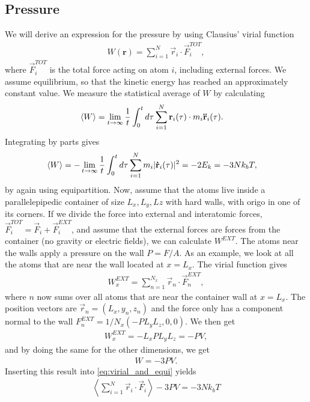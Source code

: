 \subsection{Pressure}
We will derive an expression for the pressure by using Clausius' virial function
\begin{align}
    W(\textbf{r}) = \sum_{i=1}^N \vec r_i \cdot \vec F_i^{TOT},
\end{align}
where $\vec F_i^{TOT}$ is the total force acting on atom $i$, including external forces. We assume equilibrium, so that the kinetic energy has reached an approximately constant value. We measure the statistical average of $W$ by calculating
\begin{align}
    \langle W \rangle &= \lim_{t\rightarrow\infty} {1\over t} \int_0^t d\tau \sum_{i=1}^N \vec r_i(\tau) \cdot m_i \vec{\ddot r}_i(\tau).
\end{align}
Integrating by parts gives
\begin{align}
    \label{eq:virial_and_equi}
    \langle W \rangle &= -\lim_{t\rightarrow\infty} {1\over t} \int_0^t d\tau \sum_{i=1}^N m_i |\vec{\dot r}_i(\tau)|^2 = -2E_k = -3Nk_bT,
\end{align}
by again using equipartition. Now, assume that the atoms live inside a parallelepipedic container of size $L_x, L_y, Lz$ with hard walls, with origo in one of its corners. If we divide the force into external and interatomic forces, $\vec F_i^{TOT} = \vec F_i + \vec F_i^{EXT}$, and assume that the external forces are forces from the container (no gravity or electric fields), we can calculate $W^{EXT}$. The atoms near the walls apply a pressure on the wall $P = F/A$. As an example, we look at all the atoms that are near the wall located at $x=L_x$. The virial function gives
\begin{align}
    W^{EXT}_x = \sum_{n=1}^{N_x}\vec r_n\cdot \vec F_n^{EXT},
\end{align}
where $n$ now sums over all atoms that are near the container wall at $x=L_x$. The position vectors are $\vec r_n = (L_x, y_n, z_n)$ and the force only has a component normal to the wall $F_n^{EXT} = 1/N_x(-PL_yL_z, 0, 0)$. We then get
\begin{align}
    W^{EXT}_x = -L_xPL_yL_z = -PV,
\end{align}
and by doing the same for the other dimensions, we get
\begin{align}
    W = -3PV.
\end{align}
Inserting this result into \eqref{eq:virial_and_equi} yields
\begin{align}
    \left\langle \sum_{i=1}^N \vec r_i \cdot \vec F_i\right\rangle - 3PV = -3Nk_bT
\end{align}

